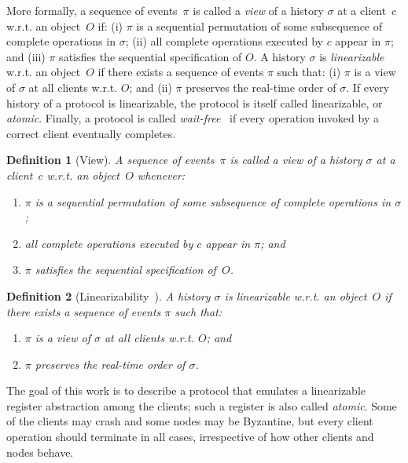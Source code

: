 \documentclass[oribibl]{llncs}
\theoremstyle{definition-boldhead}
\newtheorem{definition}{Definition}
\newcommand{\nodes}{nodes\xspace}
\begin{document}
\if\submit\yes
 More formally, a sequence of events~$\pi$ is called a \emph{view} of a history $\sigma$ at a client~$c$ w.r.t. an object~$O$ if: (i) $\pi$ is a sequential permutation of some subsequence of complete operations in $\sigma$; (ii) all complete operations executed by $c$ appear in $\pi$; and (iii) $\pi$ satisfies the sequential specification of $O$. A history $\sigma$ is \emph{linearizable}~\cite{herwin90} w.r.t. an object~$O$ if
  there exists a sequence of events $\pi$ such that: (i) $\pi$ is a view of $\sigma$ at all clients w.r.t. $O$; and (ii) $\pi$ preserves the real-time order of $\sigma$. If every history of a protocol is  linearizable, the protocol is itself called linearizable, or \emph{atomic}. Finally, a protocol is called \emph{wait-free}~\cite{herlih91} if every operation invoked by a correct client eventually completes.
\else

\begin{definition}[View]
  A sequence of events~$\pi$ is called a \emph{view} of a history
  $\sigma$ at a client~$c$ w.r.t. an object~$O$ whenever:
\begin{enumerate}
\item $\pi$ is a sequential permutation of some subsequence
of complete operations in $\sigma$;
\item all complete operations executed by $c$ appear in $\pi$; and
\item $\pi$ satisfies the sequential specification of~$O$.
\end{enumerate}
\end{definition}

\begin{definition}[Linearizability~\cite{herwin90}]
  A history $\sigma$ is linearizable w.r.t. an object~$O$ if
  there exists a sequence of events $\pi$ such that:
\begin{enumerate}
\item $\pi$ is a view of $\sigma$ at all clients w.r.t. $O$; and
\item $\pi$ preserves the real-time order of $\sigma$.
\end{enumerate}
\end{definition}

The goal of this work is to describe a protocol that emulates a
linearizable register abstraction among the clients; such a register
is also called \emph{atomic}.  Some of the clients may crash and some
\nodes may be Byzantine, but every client operation should terminate
in all cases, irrespective of how other clients and \nodes behave.
\end{document}
